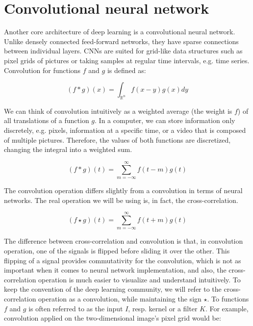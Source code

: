 \section{Convolutional neural network}


Another core architecture of deep learning is a convolutional neural network. Unlike densely connected feed-forward networks, they have sparse connections between individual layers. CNNs are suited for grid-like data structures such as pixel grids of pictures or taking samples at regular time intervals, e.g. time series. Convolution for functions $f$ and $g$ is defined as:

\begin{equation}
    (f*g)(x) = \int_{\mathbb{R}^n} f(x-y)g(x)dy
\end{equation}

We can think of convolution intuitively as a weighted average (the weight is $f$) of all translations of a function $g$. In a computer, we can store information only discretely, e.g. pixels, information at a specific time, or a video that is composed of multiple pictures. Therefore, the values of both functions are discretized, changing the integral into a weighted sum.

\begin{equation}
    (f*g)(t) = \sum_{m= -\infty}^{\infty} f(t-m)g(t)
\end{equation}

The convolution operation differs slightly from a convolution in terms of neural networks. The real operation we will be using is, in fact, the cross-correlation.

\begin{equation}
    (f \star g)(t) = \sum_{m = -\infty}^{\infty} f(t+m)g(t)
\end{equation}

The difference between cross-correlation and convolution is that, in convolution operation, one of the signals is flipped before sliding it over the other. This flipping of a signal provides commutativity for the convolution, which is not as important when it comes to neural network implementation, and also, the cross-correlation operation is much easier to visualize and understand intuitively. To keep the convention of the deep learning community, we will refer to the cross-correlation operation as a convolution, while maintaining the sign $\star$. To functions $f$ and $g$ is often referred to as the input $I$, resp. kernel or a filter $K$. For example, convolution applied on the two-dimensional image's pixel grid would be: 

